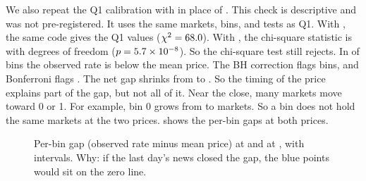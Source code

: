 We also repeat the Q1 calibration with \pT{} in place of \pOne.
This check is descriptive and was not pre-registered.
It uses the same markets, bins, and tests as Q1.
With \pOne, the same code gives the Q1 values ($\chi^2=68.0$).
With \pT, the chi-square statistic is \RTwoCloseCloseChiSq{} with \QOneDf{} degrees of freedom ($p=5.7\times10^{-8}$).
So the chi-square test still rejects.
In \RTwoCloseCloseBinsNeg{} of \GapBinsTotal{} bins the observed rate is below the mean price.
The BH correction flags \RTwoCloseCloseBinsBh{} bins, and Bonferroni flags \RTwoCloseCloseBinsBonferroni.
The net gap shrinks from \RTwoCloseOneDayNetGap{} to \RTwoCloseCloseNetGap.
So the timing of the price explains part of the gap, but not all of it.
Near the close, many markets move toward 0 or 1.
For example, bin 0 grows from \RTwoCloseOneDayBinZeroN{} to \RTwoCloseCloseBinZeroN{} markets.
So a bin does not hold the same markets at the two prices.
 shows the per-bin gaps at both prices.

\begin{figure}[H]
\centering
{}
\caption{Per-bin gap (observed rate minus mean price) at \pOne{} and at \pT, with \CiLevel{} intervals. Why: if the last day's news closed the gap, the blue points would sit on the zero line.}%
\label{fig:r2-close}
\end{figure}
